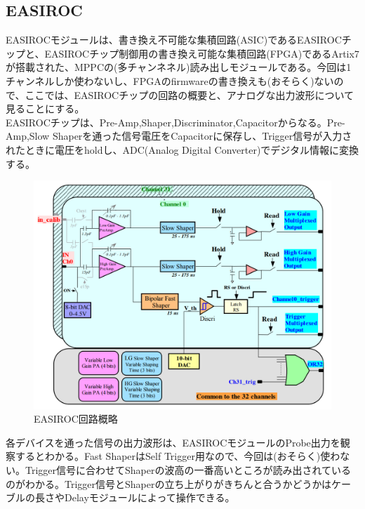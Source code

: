 \documentclass[10pt]{ujarticle}
\begin{document}
\subsection{EASIROC}
EASIROCモジュールは、書き換え不可能な集積回路(ASIC)であるEASIROCチップと、EASIROCチップ制御用の書き換え可能な集積回路(FPGA)であるArtix7が搭載された、MPPCの(多チャンネネル)読み出しモジュールである。今回は1チャンネルしか使わないし、FPGAのfirmwareの書き換えも(おそらく)ないので、ここでは、EASIROCチップの回路の概要と、アナログな出力波形について見ることにする。\\
EASIROCチップは、Pre-Amp,Shaper,Discriminator,Capacitorからなる。Pre-Amp,Slow Shaperを通った信号電圧をCapacitorに保存し、Trigger信号が入力されたときに電圧をholdし、ADC(Analog Digital Converter)でデジタル情報に変換する。
\begin{figure}[h]
\begin{center}
\includegraphics[width=12cm]{EASIROCCircuitDiagram.PNG}
\end{center}
\caption{EASIROC回路概略}
\end{figure}
各デバイスを通った信号の出力波形は、EASIROCモジュールのProbe出力を観察するとわかる。Fast ShaperはSelf Trigger用なので、今回は(おそらく)使わない。Trigger信号に合わせてShaperの波高の一番高いところが読み出されているのがわかる。Trigger信号とShaperの立ち上がりがきちんと合うかどうかはケーブルの長さやDelayモジュールによって操作できる。
\end{document}
